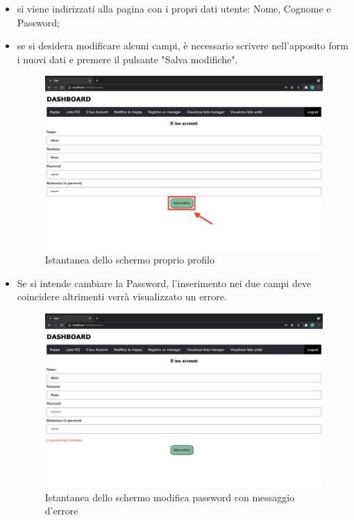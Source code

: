 \begin{itemize}
    \item si viene indirizzati alla pagina con i propri dati utente: Nome, Cognome e Password;
    \item se si desidera modificare alcuni campi, è necessario scrivere nell'apposito form i nuovi dati e premere il pulsante "Salva modifiche".
    \begin{figure}[H]
        \centering
        \includegraphics[scale=0.12]{res/images/account_user.png}
        \caption{Istantanea dello schermo proprio profilo}
    \end{figure}
    \item Se si intende cambiare la Password, l'inserimento nei due campi deve coincidere altrimenti verrà visualizzato un errore.
    \begin{figure}[H]
        \centering
        \includegraphics[scale=0.12]{res/images/account_errore.png}
        \caption{Istantanea dello schermo modifica
        password con messaggio d'errore}
    \end{figure}
\end{itemize}



